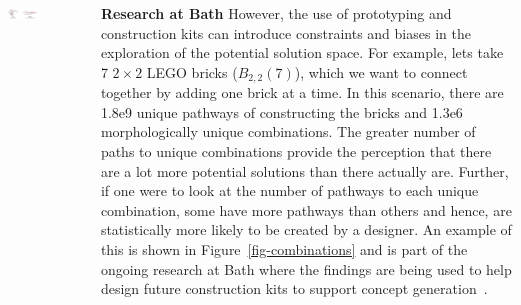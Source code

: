 \documentclass[20pt, a0paper, portrait]{tikzposter}
\begin{document}
\begin{columns}
{    \begin{tikzfigure}
    \centering
    \includegraphics[width=0.4\textwidth]{figures/whyprototype.png}
    \label{fig-why-prototype}
    \end{tikzfigure}
    
    \textbf{Research at Bath} However, the use of prototyping and construction kits can introduce constraints and biases in the exploration of the potential solution space. For example, lets take 7 $2\times2$ LEGO\texttrademark{} bricks ($B_{2,2}(7)$), which we want to connect together by adding one brick at a time. In this scenario, there are 1.8e9 unique pathways of constructing the bricks and 1.3e6 morphologically unique combinations. The greater number of paths to unique combinations provide the perception that there are a lot more potential solutions than there actually are. Further, if one were to look at the number of pathways to each unique combination, some have more pathways than others and hence, are statistically more likely to be created by a designer. An example of this is shown in Figure~\ref{fig-combinations} and is part of the ongoing research at Bath where the findings are being used to help design future construction kits to support concept generation~\autocite{design2018}.

}
\end{columns}
\end{document}
